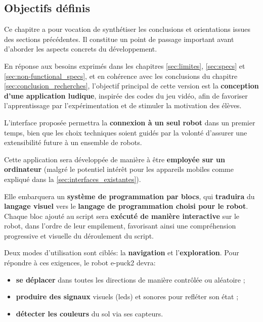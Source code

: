\subsection{Objectifs définis} \label{sec:objectifs_finaux}

Ce chapitre a pour vocation de synthétiser les conclusions et orientations issues des sections précédentes. 
Il constitue un point de passage important avant d’aborder les aspects concrets du développement.

En réponse aux besoins exprimés dans les chapitres \ref{sec:limites}, \ref{sec:specs} et \ref{sec:non-functional_specs}, et en cohérence avec les conclusions du chapitre \ref{sec:conclusion_recherches}, l’objectif principal de cette version est la \textbf{conception d’une application ludique}, inspirée des codes du jeu vidéo, afin de favoriser l’apprentissage par l’expérimentation et de stimuler la motivation des élèves.

L’interface proposée permettra la \textbf{connexion à un seul robot} dans un premier temps, bien que les choix techniques soient guidés par la volonté d’assurer une extensibilité future à un ensemble de robots.

Cette application sera développée de manière à être \textbf{employée sur un ordinateur} (malgré le potentiel intérêt pour les appareils mobiles comme expliqué dans la \autoref{sec:interfaces_existantes}).

Elle embarquera un \textbf{système de programmation par blocs}, qui \textbf{traduira} du \textbf{langage visuel} vers le \textbf{langage de programmation choisi pour le robot}.
Chaque bloc ajouté au script sera \textbf{exécuté de manière interactive} sur le robot, dans l’ordre de leur empilement, favorisant ainsi une compréhension progressive et visuelle du déroulement du script.

Deux modes d’utilisation sont ciblés: la \textbf{navigation} et l’\textbf{exploration}. 
Pour répondre à ces exigences, le robot e-puck2 devra:
\begin{itemize}
    \item \textbf{se déplacer} dans toutes les directions de manière contrôlée ou aléatoire ;
    \item \textbf{produire des signaux} visuels (\acrshort{led}s) et sonores pour refléter son état ;
    \item \textbf{détecter les couleurs} du sol via ses capteurs.
\end{itemize}

